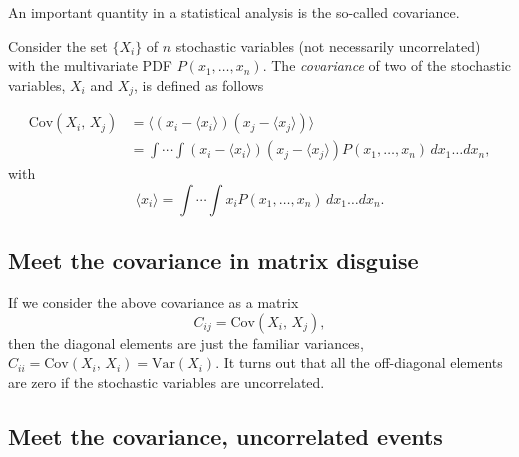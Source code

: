 \documentclass[%
oneside,                 %
final,                   %
10pt]{article}
\newenvironment{block_mdfboxadmon}[1][]{
\begin{block_mdfboxmdframed}[frametitle=#1]
}
{
\end{block_mdfboxmdframed}
}
\begin{document}
\begin{block_mdfboxadmon}[]
An important quantity in a statistical analysis is the so-called covariance. 

Consider the set $\{X_i\}$ of $n$
stochastic variables (not necessarily uncorrelated) with the
multivariate PDF $P(x_1,\dots,x_n)$. The \emph{covariance} of two
of the stochastic variables, $X_i$ and $X_j$, is defined as follows

\begin{align}
\mathrm{Cov}(X_i,\,X_j) & = \langle (x_i-\langle x_i\rangle)(x_j-\langle x_j\rangle)\rangle \\
&=\int\cdots\int (x_i-\langle x_i\rangle)(x_j-\langle x_j\rangle)P(x_1,\dots,x_n)\,dx_1\dots dx_n,
\label{eq:def_covariance}
\end{align}
with
\begin{equation*}
\langle x_i\rangle =
\int\cdots\int x_i P(x_1,\dots,x_n)\,dx_1\dots dx_n.
\end{equation*}
\end{block_mdfboxadmon} %





\subsection{Meet the  covariance in matrix disguise}

\begin{block_mdfboxadmon}[]
If we consider the above covariance as a matrix 
\[
C_{ij} =\mathrm{Cov}(X_i,\,X_j), 
\]
then the diagonal elements are just the familiar
variances, $C_{ii} = \mathrm{Cov}(X_i,\,X_i) = \mathrm{Var}(X_i)$. It turns out that
all the off-diagonal elements are zero if the stochastic variables are
uncorrelated.
\end{block_mdfboxadmon} %



\subsection{Meet the  covariance, uncorrelated events}
\end{document}
